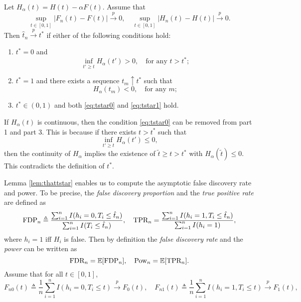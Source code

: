 \documentclass{biometrika}
\newcommand{\FDP}{\textnormal{FDP}}
\newcommand{\FDR}{\textnormal{FDR}}
\newcommand{\Pow}{\textnormal{Pow}}
\newcommand{\TPR}{\textnormal{TPR}}
\newcommand{\td}{\tilde}
\newcommand{\E}{\mathbb{E}}
\newcommand{\1}{\mathbf{1}}
\begin{document}
\begin{lemma}\label{lem:thattstar}
  Let $H_{\alpha}(t) = H(t) - \alpha F(t)$. Assume that 
  \begin{equation}
    \label{eq:uniform_convergence}
    \sup_{t\in [0, 1]}|F_{n}(t) - F(t)|\stackrel{p}{\rightarrow} 0, \quad \sup_{t\in [0, 1]}|H_{n}(t) - H(t)|\stackrel{p}{\rightarrow} 0.
  \end{equation}
Then $\hat{t}_{n}\stackrel{p}{\rightarrow} t^{*}$ if either of the following conditions hold:
  \begin{enumerate}
  \item $t^{*} = 0$ and 
    \begin{equation}
      \label{eq:tstar0}
      \inf_{t' \ge t}H_{\alpha}(t') > 0, \quad \mbox{for any }t > t^{*};
    \end{equation}
  \item $t^{*} = 1$ and there exists a sequence $t_{m}\uparrow t^{*}$ such that
    \begin{equation}
      \label{eq:tstar1}
      H_{\alpha}(t_{m}) < 0, \quad \mbox{for any }m;
    \end{equation}
  \item $t^{*}\in (0, 1)$ and both \eqref{eq:tstar0} and \eqref{eq:tstar1} hold.
  \end{enumerate}
\end{lemma}
\begin{remark}
  If $H_{\alpha}(t)$ is continuous, then the condition \eqref{eq:tstar0} can be removed from part 1 and part 3. This is because if there exists $t > t^{*}$ such that
\[\inf_{t' \ge t}H_{\alpha}(t')\le 0,\]
then the continuity of $H_{\alpha}$ implies the existence of $\td{t}\ge t > t^{*}$ with $H_{\alpha}(\td{t})\le 0$. This contradicts the definition of $t^{*}$. 
\end{remark}
Lemma \ref{lem:thattstar} enables us to compute the asymptotic false discovery rate and power. To be precise, the \emph{false discovery proportion} and the \emph{true positive rate} are defined as
\[\FDP_{n} \triangleq \frac{\sum_{i=1}^{n}I(h_{i} = 0, T_{i}\le \hat{t}_{n})}{\sum_{i=1}^{n}I(T_{i}\le \hat{t}_{n})}, \quad \TPR_{n} = \frac{\sum_{i=1}^{n}I(h_{i} = 1, T_{i}\le \hat{t}_{n})}{\sum_{i=1}^{n}I(h_{i} = 1)},\]
where $h_{i} = 1$ iff $H_{i}$ is false. Then by definition the \emph{false discovery rate} and the \emph{power} can be written as 
\[\FDR_{n} = \E [\FDP_{n}], \quad \Pow_{n} = \E [\TPR_{n}].\]
Assume that for all $t \in [0, 1]$, 
\begin{equation}
  \label{eq:Fn01}
  F_{n0}(t)\triangleq \frac{1}{n}\sum_{i=1}^{n}I(h_{i} = 0, T_{i}\le t)\stackrel{p}{\rightarrow} F_{0}(t), \quad F_{n1}(t)\triangleq \frac{1}{n}\sum_{i=1}^{n}I(h_{i} = 1, T_{i}\le t)\stackrel{p}{\rightarrow} F_{1}(t),
\end{equation}
\end{document}
